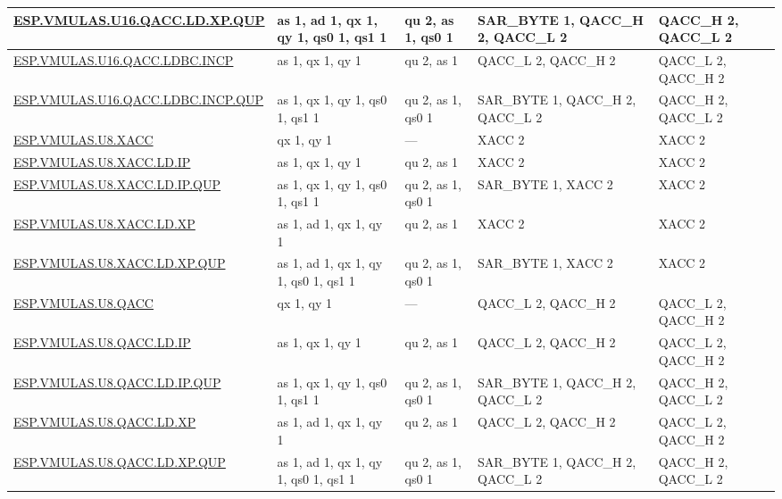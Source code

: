 \begin{longtable}[c]{|l|m{2.5cm}|m{2.5cm}|m{2.5cm}|m{2.5cm}|}
    \hyperref[instruction:ESPVMULASU16QACCLDXPQUP]{ESP.VMULAS.U16.QACC.LD.XP.QUP} & as 1, ad 1, qx 1, qy 1, qs0 1, qs1 1 & qu 2, as 1, qs0 1 & SAR\_BYTE 1, QACC\_H 2, QACC\_L 2 & QACC\_H 2, QACC\_L 2\\\hline
    \hyperref[instruction:ESPVMULASU16QACCLDBCINCP]{ESP.VMULAS.U16.QACC.LDBC.INCP} & as 1, qx 1, qy 1 & qu 2, as 1 & QACC\_L 2, QACC\_H 2 & QACC\_L 2, QACC\_H 2\\\hline
    \hyperref[instruction:ESPVMULASU16QACCLDBCINCPQUP]{ESP.VMULAS.U16.QACC.LDBC.INCP.QUP} & as 1, qx 1, qy 1, qs0 1, qs1 1 & qu 2, as 1, qs0 1 & SAR\_BYTE 1, QACC\_H 2, QACC\_L 2 & QACC\_H 2, QACC\_L 2\\\hline
    \hyperref[instruction:ESPVMULASU8XACC]{ESP.VMULAS.U8.XACC} & qx 1, qy 1 & — & XACC 2 & XACC 2\\\hline
    \hyperref[instruction:ESPVMULASU8XACCLDIP]{ESP.VMULAS.U8.XACC.LD.IP} & as 1, qx 1, qy 1 & qu 2, as 1 & XACC 2 & XACC 2\\\hline
    \hyperref[instruction:ESPVMULASU8XACCLDIPQUP]{ESP.VMULAS.U8.XACC.LD.IP.QUP} & as 1, qx 1, qy 1, qs0 1, qs1 1 & qu 2, as 1, qs0 1 & SAR\_BYTE 1, XACC 2 & XACC 2\\\hline
    \hyperref[instruction:ESPVMULASU8XACCLDXP]{ESP.VMULAS.U8.XACC.LD.XP} & as 1, ad 1, qx 1, qy 1 & qu 2, as 1 & XACC 2 & XACC 2\\\hline
    \hyperref[instruction:ESPVMULASU8XACCLDXPQUP]{ESP.VMULAS.U8.XACC.LD.XP.QUP} & as 1, ad 1, qx 1, qy 1, qs0 1, qs1 1 & qu 2, as 1, qs0 1 & SAR\_BYTE 1, XACC 2 & XACC 2\\\hline
    \hyperref[instruction:ESPVMULASU8QACC]{ESP.VMULAS.U8.QACC} & qx 1, qy 1 & — & QACC\_L 2, QACC\_H 2 & QACC\_L 2, QACC\_H 2\\\hline
    \hyperref[instruction:ESPVMULASU8QACCLDIP]{ESP.VMULAS.U8.QACC.LD.IP} & as 1, qx 1, qy 1 & qu 2, as 1 & QACC\_L 2, QACC\_H 2 & QACC\_L 2, QACC\_H 2\\\hline
    \hyperref[instruction:ESPVMULASU8QACCLDIPQUP]{ESP.VMULAS.U8.QACC.LD.IP.QUP} & as 1, qx 1, qy 1, qs0 1, qs1 1 & qu 2, as 1, qs0 1 & SAR\_BYTE 1, QACC\_H 2, QACC\_L 2 & QACC\_H 2, QACC\_L 2\\\hline
    \hyperref[instruction:ESPVMULASU8QACCLDXP]{ESP.VMULAS.U8.QACC.LD.XP} & as 1, ad 1, qx 1, qy 1 & qu 2, as 1 & QACC\_L 2, QACC\_H 2 & QACC\_L 2, QACC\_H 2\\\hline
    \hyperref[instruction:ESPVMULASU8QACCLDXPQUP]{ESP.VMULAS.U8.QACC.LD.XP.QUP} & as 1, ad 1, qx 1, qy 1, qs0 1, qs1 1 & qu 2, as 1, qs0 1 & SAR\_BYTE 1, QACC\_H 2, QACC\_L 2 & QACC\_H 2, QACC\_L 2\\\hline

\end{longtable}
